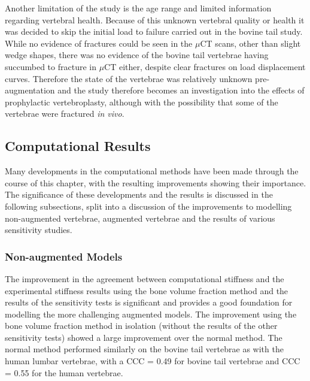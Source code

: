 Another limitation of the study is the age range and limited information
regarding vertebral health.  Because of this unknown vertebral quality or
health it was decided to skip the initial load to failure carried out in the
bovine tail study.  While no evidence of fractures could be seen in the $\mu$CT
scans, other than slight wedge shapes, there was no evidence of the bovine tail
vertebrae having succumbed to fracture in $\mu$CT either, despite clear
fractures on load displacement curves.  Therefore the state of the vertebrae
was relatively unknown pre-augmentation and the study therefore becomes an
investigation into the effects of prophylactic vertebroplasty, although with
the possibility that some of the vertebrae were fractured \textit{in vivo}.




\subsection{Computational Results}

Many developments in the computational methods have been made through the
course of this chapter, with the resulting improvements showing their
importance. The significance of these developments and the results is discussed
in the following subsections, split into a discussion of the improvements to
modelling non-augmented vertebrae, augmented vertebrae and the results of
various sensitivity studies.


\subsubsection{Non-augmented Models}

The improvement in the agreement between computational stiffness and the
experimental stiffness results using the bone volume fraction method and the
results of the sensitivity tests is significant and provides a good foundation
for modelling the more challenging augmented models. The improvement using the
bone volume fraction method in isolation (without the results of the other
sensitivity tests) showed a large improvement over the normal method.  The
normal method performed similarly on the bovine tail vertebrae as with the
human lumbar vertebrae, with a CCC = 0.49 for bovine tail vertebrae and CCC =
0.55 for the human vertebrae. 

